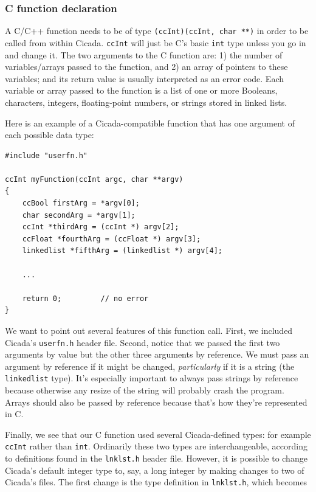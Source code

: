 \documentclass{article}
\newenvironment{code}{
       \begin{list}{}{
               \setlength{\leftmargin}{.4in}
               \setlength{\rightmargin}{0in}
               \setlength{\topsep}{.2in}
       }
       \small
       \item[] }
       { \end{list}   }
\begin{document}
\subsubsection{C function declaration}

A C/C++ function needs to be of type \verb#(ccInt)(ccInt, char **)# in order to be called from within Cicada.  \verb#ccInt# will just be C's basic \verb#int# type unless you go in and change it.  The two arguments to the C function are:  1) the number of variables/arrays passed to the function, and 2) an array of pointers to these variables; and its return value is usually interpreted as an error code.  Each variable or array passed to the function is a list of one or more Booleans, characters, integers, floating-point numbers, or strings stored in linked lists.

Here is an example of a Cicada-compatible function that has one argument of each possible data type:

\begin{code} \begin{verbatim}
#include "userfn.h"

ccInt myFunction(ccInt argc, char **argv)
{
    ccBool firstArg = *argv[0];
    char secondArg = *argv[1];
    ccInt *thirdArg = (ccInt *) argv[2];
    ccFloat *fourthArg = (ccFloat *) argv[3];
    linkedlist *fifthArg = (linkedlist *) argv[4];
    
    ...
    
    return 0;         // no error
}
\end{verbatim} \end{code}

\noindent We want to point out several features of this function call.  First, we included Cicada's \verb#userfn.h# header file.  Second, notice that we passed the first two arguments by value but the other three arguments by reference.  We must pass an argument by reference if it might be changed, \emph{particularly} if it is a string (the \verb#linkedlist# type).  It's especially important to always pass strings by reference because otherwise any resize of the string will probably crash the program.  Arrays should also be passed by reference because that's how they're represented in C.

Finally, we see that our C function used several Cicada-defined types:  for example \verb#ccInt# rather than \verb#int#.  Ordinarily these two types are interchangeable, according to definitions found in the \verb#lnklst.h# header file.  However, it is possible to change Cicada's default integer type to, say, a long integer by making changes to two of Cicada's files.  The first change is the type definition in \verb#lnklst.h#, which becomes
\end{document}
